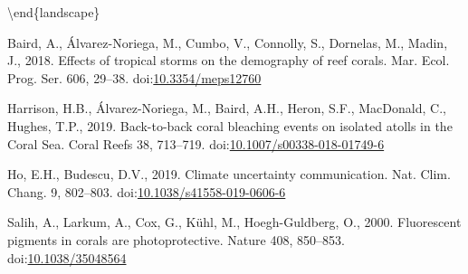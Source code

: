 \documentclass[review]{elsarticle} %
\begin{document}
\textbackslash{}end\{landscape\}

\hypertarget{refs}{}
\leavevmode\hypertarget{ref-baird_effects_2018}{}%
Baird, A., Álvarez-Noriega, M., Cumbo, V., Connolly, S., Dornelas, M.,
Madin, J., 2018. Effects of tropical storms on the demography of reef
corals. Mar. Ecol. Prog. Ser. 606, 29--38.
doi:\href{https://doi.org/10.3354/meps12760}{10.3354/meps12760}

\leavevmode\hypertarget{ref-harrison_back_2019}{}%
Harrison, H.B., Álvarez-Noriega, M., Baird, A.H., Heron, S.F.,
MacDonald, C., Hughes, T.P., 2019. Back-to-back coral bleaching events
on isolated atolls in the Coral Sea. Coral Reefs 38, 713--719.
doi:\href{https://doi.org/10.1007/s00338-018-01749-6}{10.1007/s00338-018-01749-6}

\leavevmode\hypertarget{ref-ho_climate_2019}{}%
Ho, E.H., Budescu, D.V., 2019. Climate uncertainty communication. Nat.
Clim. Chang. 9, 802--803.
doi:\href{https://doi.org/10.1038/s41558-019-0606-6}{10.1038/s41558-019-0606-6}

\leavevmode\hypertarget{ref-salih_fluorescent_2000}{}%
Salih, A., Larkum, A., Cox, G., Kühl, M., Hoegh-Guldberg, O., 2000.
Fluorescent pigments in corals are photoprotective. Nature 408,
850--853. doi:\href{https://doi.org/10.1038/35048564}{10.1038/35048564}
\end{document}
